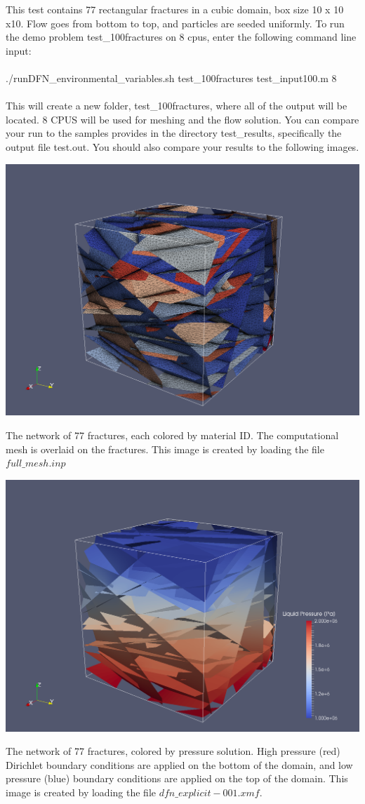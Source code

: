 \documentclass{article}
\begin{document}
This test contains 77 rectangular fractures in a cubic domain, box size 10 x 10 x10. 
 Flow goes from bottom to top, and particles are seeded uniformly.    
To run the demo problem test\_100fractures on 8 cpus, enter the following command line input:\\\\
 ./runDFN\_environmental\_variables.sh test\_100fractures test\_input100.m 8\\\\
 This will create a new folder, test\_100fractures, where all of the output will be located. 
 8 CPUS will be used for meshing and the flow solution. 
You can compare your run to the samples provides in the directory test\_results, specifically the output file test.out.
You should also compare your results to the following images. 


\begin{center}
\includegraphics[width=0.75\linewidth]{figs/test_100_fracture_mesh.png}\\
\end{center}
The network of 77 fractures, each colored by material ID. 
The computational mesh is overlaid on the fractures. 
This image is created by loading the file $full\_mesh.inp$


\begin{center}
\includegraphics[width=0.75\linewidth]{figs/test_100_fracture_pressure.png}\\
\end{center}
The network of 77 fractures,  colored by pressure solution.  
High pressure (red) Dirichlet boundary conditions are applied on the bottom of the domain, and low pressure (blue)  boundary conditions are applied on the top of the domain. 
This image is created by loading the file $dfn\_explicit-001.xmf$.
\end{document}
